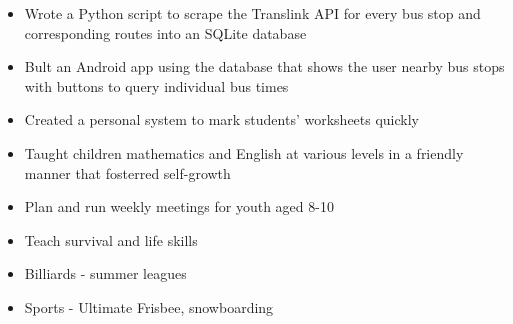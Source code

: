 \documentclass{resume}
\begin{document}
\begin{itemize}
	\item Wrote a Python script to scrape the Translink API for every bus stop and corresponding routes into an SQLite database
	\item Bult an Android app using the database that shows the user nearby bus stops with buttons to query individual bus times
\end{itemize}

\OtherWorkExperience

\begin{itemize}
	\item Created a personal system to mark students' worksheets quickly
	\item Taught children mathematics and English at various levels in a friendly manner that fosterred self-growth
\end{itemize}

\clearpage %

\VolunteerWorkExperience

\begin{itemize}
	\item Plan and run weekly meetings for youth aged 8-10
	\item Teach survival and life skills
\end{itemize}

\Education


\ProfessionalAffiliations


\Intrests

\begin{itemize}
	\item Billiards - summer leagues
	\item Sports - Ultimate Frisbee, snowboarding
\end{itemize}
\end{document}
